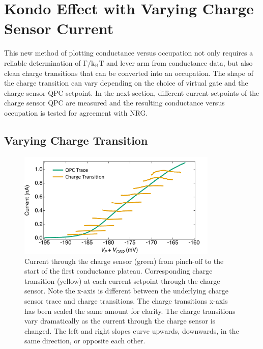 \section{Kondo Effect with Varying Charge Sensor Current}

This new method of plotting conductance versus occupation not only requires a reliable determination of $\mathrm{\Gamma/k_BT}$ and lever arm from conductance data, but also clean charge transitions that can be converted into an occupation. The shape of the charge transition can vary depending on the choice of virtual gate and the charge sensor QPC setpoint. In the next section, different current setpoints of the charge sensor QPC are measured and the resulting conductance versus occupation is tested for agreement with NRG.


\subsection{Varying Charge Transition}


\begin{figure}[!bht]
 \begin{center}
 \includegraphics[width=0.85\textwidth]{figures/ch3/figure16.pdf}
 \caption[Varying Charge Sensor Current Setpoint]{\label{fig:ch3/cond_occ_ct_set-points} 
 Current through the charge sensor (green) from pinch-off to the start of the first conductance plateau. Corresponding charge transition (yellow) at each current setpoint through the charge sensor. Note the x-axis is different between the underlying charge sensor trace and charge transitions. The charge transitions x-axis has been scaled the same amount for clarity. The charge transitions vary dramatically as the current through the charge sensor is changed. The left and right slopes curve upwards, downwards, in the same direction, or opposite each other.}
 \end{center}
\end{figure}


